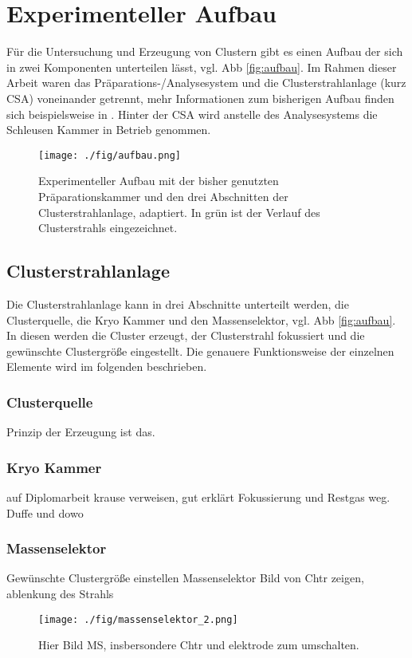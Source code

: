 \chapter{Experimenteller Aufbau}
Für die Untersuchung und Erzeugung von Clustern gibt es einen Aufbau der sich in zwei Komponenten unterteilen lässt, vgl. Abb \ref{fig:aufbau}.
Im Rahmen dieser Arbeit waren das Präparations-/Analysesystem und die Clusterstrahlanlage (kurz CSA) voneinander getrennt, mehr Informationen zum bisherigen Aufbau finden sich beispielsweise in \cite{wolter}.
Hinter der CSA wird anstelle des Analysesystems die Schleusen Kammer in Betrieb genommen.
\begin{figure}
    \centering
    \texttt{[image: ./fig/aufbau.png]}
    \caption{Experimenteller Aufbau mit der bisher genutzten Präparationskammer und den drei Abschnitten der Clusterstrahlanlage, \cite[S. 20]{wolter} adaptiert. 
    In grün ist der Verlauf des Clusterstrahls eingezeichnet.}
    \label{fig:csaaufbau}
\end{figure}

\section{Clusterstrahlanlage}
Die Clusterstrahlanlage kann in drei Abschnitte unterteilt werden, die Clusterquelle, die Kryo Kammer und den Massenselektor, vgl. Abb \ref{fig:aufbau}.
In diesen werden die Cluster erzeugt, der Clusterstrahl fokussiert und die gewünschte Clustergröße eingestellt. Die genauere Funktionsweise der einzelnen Elemente wird im folgenden beschrieben.
\subsection{Clusterquelle}
Prinzip der Erzeugung ist das.
\subsection{Kryo Kammer}
auf Diplomarbeit krause verweisen, gut erklärt
Fokussierung und Restgas weg.
Duffe und dowo
\subsection{Massenselektor}
Gewünschte Clustergröße einstellen 
Massenselektor \cite{Issendorff.1999}
Bild von Chtr zeigen, ablenkung des Strahls
\begin{figure}
    \centering
    \texttt{[image: ./fig/massenselektor\_2.png]}
    \caption{Hier Bild MS, insbersondere Chtr und elektrode zum umschalten.}
    \label{fig:mschtr}
\end{figure}
